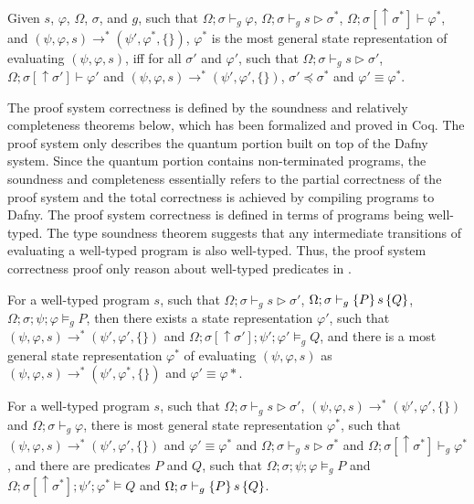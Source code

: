 \begin{definition}\label{def:most-gen}\rm 
  Given $s$, $\varphi$, $\Omega$, $\sigma$, and $g$, such that $\Omega;\sigma\vdash_g \varphi$, $\Omega;\sigma\vdash_g s \triangleright \sigma^*$, $\Omega;\sigma[\uparrow \sigma^*]\vdash \varphi^*$, and $(\psi,\varphi,s) \longrightarrow^{*} (\psi',\varphi^*,\{\})$, $\varphi^*$ is the most general state representation of evaluating $(\psi,\varphi,s)$, iff for all $\sigma'$ and $\varphi'$, such that $\Omega;\sigma\vdash_g s \triangleright \sigma'$, $\Omega;\sigma[\uparrow \sigma']\vdash \varphi'$ and $(\psi,\varphi,s) \longrightarrow^{*} (\psi',\varphi',\{\})$, $\sigma' \preceq \sigma^*$ and $\varphi' \equiv \varphi^*$.
\end{definition}

The \qafny proof system correctness is defined by the soundness and relatively completeness theorems below, which has been formalized and proved in Coq. The \qafny proof system only describes the quantum portion built on top of the Dafny system. Since the quantum portion contains non-terminated programs, the soundness and completeness essentially refers to the partial correctness of the \qafny proof system and the total correctness is achieved by compiling \qafny programs to Dafny. The \qafny proof system correctness is defined in terms of programs being well-typed. The type soundness theorem suggests that any intermediate transitions of evaluating a well-typed \qafny program is also well-typed. Thus, the proof system correctness proof only reason about well-typed predicates in .


\begin{theorem}\label{thm:proof-soundness}\rm 
For a well-typed program $s$, such that $\Omega;\sigma\vdash_g s \triangleright \sigma'$, $\Omega;\sigma\vdash_{g}\{P\}\, s \,\{Q\}$, $\Omega;\sigma;\psi;\varphi\models_g P$, then there exists a state representation $\varphi'$, such that $(\psi,\varphi,s)\longrightarrow^* (\psi',\varphi',\{\})$ and $\Omega;\sigma[\uparrow\sigma'];\psi';\varphi'\models_g Q$, and there is a most general state representation $\varphi^*$ of evaluating $(\psi,\varphi,s)$ as $(\psi,\varphi,s)\longrightarrow^* (\psi',\varphi^*,\{\})$ and $\varphi' \equiv \varphi*$.
\end{theorem}

\begin{theorem}\label{thm:proof-completeness}\rm 
For a well-typed program $s$, such that $\Omega;\sigma\vdash_g s \triangleright \sigma'$, $(\psi,\varphi,s)\longrightarrow^* (\psi',\varphi',\{\})$ and $\Omega;\sigma\vdash_g \varphi$, there is most general state representation $\varphi^*$, such that $(\psi,\varphi,s)\longrightarrow^* (\psi',\varphi',\{\})$ and $\varphi' \equiv \varphi^*$ and $\Omega;\sigma\vdash_g s \triangleright \sigma^*$ and $\Omega;\sigma[\uparrow \sigma^*]\vdash_g \varphi^*$, and there are predicates $P$ and $Q$, such that $\Omega;\sigma;\psi;\varphi\models_g P$ and $\Omega;\sigma[\uparrow\sigma^*];\psi';\varphi^* \models Q$ and $\Omega;\sigma\vdash_{g}\{P\}\, s \,\{Q\}$.
\end{theorem}





